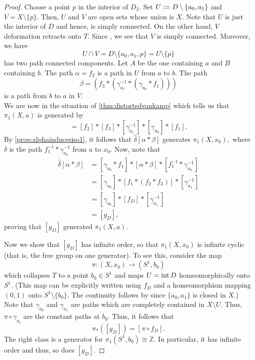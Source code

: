 \documentclass[12pt]{article}
\begin{document}
\begin{proof}
	Choose a point $p$ in the interior of $D_2.$ Set $U \vcentcolon= D\setminus\{a_0, a_1\}$ and $V = X \setminus \{p\}.$ Then, $U$ and $V$ are open sets whose union is $X.$ Note that $U$ is just the interior of $D$ and hence, is simply connected. On the other hand, $V$ deformation retracts onto $T.$ Since , we see that $V$ is simply connected. Moreover, we have
	\begin{equation*} 
		U \cap V = D \setminus \{a_0, a_1, p\} = U \setminus \{p\}
	\end{equation*}
	has two path connected components. Let $A$ be the one containing $a$ and $B$ containing $b.$ The path $\alpha = f_2$ is a path in $U$ from $a$ to $b.$ The path
	\begin{equation*} 
		\beta = (f_3*(\gamma_{a_1}^{-1}*(\gamma_{a_0}*f_1))	)
	\end{equation*} is a path from $b$ to $a$ in $V.$ \\
	We are now in the situation of \cref{thm:distortedvankamp} which tells us that $\pi_1(X, a)$ is generated by
	\begin{equation*} 
		[\alpha*\beta] = [f_2]*[f_3]*[\gamma_{a_1}^{-1}]*[\gamma_{a_0}]*[f_1].
	\end{equation*}
	By \cref{prop:alphainducesiso1}, it follows that $\hat{\delta}[\alpha*\beta]$ generates $\pi_1(X, x_0),$ where $\delta$ is the path $f_1^{-1}*\gamma_{a_0}^{-1}$ from $a$ to $x_0.$ Now, note that
	\begin{align*} 
		\hat{\delta}[\alpha*\beta] &= [\gamma_{a_0}*f_1]*[\alpha*\beta]*[f_1^{-1}*\gamma_{a_0}^{-1}]\\
		&= [\gamma_{a_0}]*[f_1*(f_2*f_3)]*[\gamma_{a_1}^{-1}]\\
		&= [\gamma_{a_0}]*[f_D]*[\gamma_{a_1}^{-1}]\\
		&= [g_D],
	\end{align*}
	proving that $[g_D]$ generated $\pi_1(X, a).$

	Now we show that $[g_D]$ has infinite order, so that $\pi_1(X, x_0)$ is infinite cyclic (that is, the free group on one generator). To see this, consider the map
	\begin{equation*} 
		\pi:(X, x_0)\to (S^1, b_0)
	\end{equation*}
	which collapses $T$ to a point $b_0 \in S^1$ and maps $U = \operatorname{int} D$ homeomorphically onto $S^1.$ (This map can be explicitly written using $f_D$ and a homeomorphism mapping $(0, 1)$ onto $S^1\setminus\{b_0\}.$ The continuity follows by  since $\{a_0, a_1\}$ is closed in $X.$) Note that $\gamma_{a_0}$ and $\gamma_{a_1}$ are paths which are completely contained in $X \setminus U.$ Thus, $\pi\circ\gamma_{a_i}$ are the constant paths at $b_0.$ Thus, it follows that
	\begin{equation*} 
		\pi_*([g_D]) = [\pi\circ f_D].
	\end{equation*}
	The right class is a generator for $\pi_1(S^1, b_0)\cong \mathbb{Z}.$ In particular, it has infinite order and thus, so does $[g_D].$


\end{proof}
\end{document}
